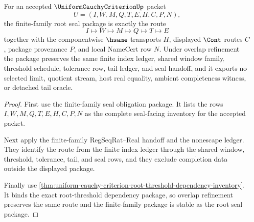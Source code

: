 \begin{theorem}
\label{thm:uniform-cauchy-criterion-finite-family-root-seal-package}
For an accepted $\UniformCauchyCriterionUp$ packet
$$
U=(I,W,M,Q,T,E,H,C,P,N),
$$
the finite-family root seal package is exactly the route
$$
I \longmapsto W \longmapsto M \longmapsto Q \longmapsto T \longmapsto E
$$
together with the componentwise $\hsame$ transports $H$, displayed $\Cont$ routes $C$, package provenance $P$, and local NameCert row $N$. Under overlap refinement the package preserves the same finite index ledger, shared window family, threshold schedule, tolerance row, tail ledger, and seal handoff, and it exports no selected limit, quotient stream, host real equality, ambient completeness witness, or detached tail oracle.
\end{theorem}
\begin{proof}
First use the finite-family seal obligation package. It lists the rows $I,W,M,Q,T,E,H,C,P,N$ as the complete seal-facing inventory for the accepted packet.

Next apply the finite-family RegSeqRat--Real handoff and the nonescape ledger. They identify the route from the finite index ledger through the shared window, threshold, tolerance, tail, and seal rows, and they exclude completion data outside the displayed package.

Finally use \autoref{thm:uniform-cauchy-criterion-root-threshold-dependency-inventory}. It binds the exact root-threshold dependency package, so overlap refinement preserves the same route and the finite-family package is stable as the root seal package.
\end{proof}

